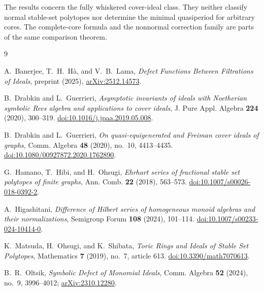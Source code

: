 \documentclass[11pt]{article}
\theoremstyle{remark}
\begin{document}
The results concern the fully whiskered cover-ideal class. They neither
classify normal stable-set polytopes nor determine the minimal
quasiperiod for arbitrary cores. The complete-core formula and the
nonnormal correction family are parts of the same comparison theorem.

\begin{thebibliography}{9}

A.~Banerjee, T.~H.~H\`a, and V.~B.~Lama,
\emph{Defect Functions Between Filtrations of Ideals},
preprint (2025),
\href{https://arxiv.org/abs/2512.14573}{arXiv:2512.14573}.

B.~Drabkin and L.~Guerrieri,
\emph{Asymptotic invariants of ideals with Noetherian symbolic Rees
algebra and applications to cover ideals},
J. Pure Appl. Algebra \textbf{224} (2020), 300--319.
\href{https://doi.org/10.1016/j.jpaa.2019.05.008}{doi:10.1016/j.jpaa.2019.05.008}.

B.~Drabkin and L.~Guerrieri,
\emph{On quasi-equigenerated and Freiman cover ideals of graphs},
Comm. Algebra \textbf{48} (2020), no.~10, 4413--4435.
\href{https://doi.org/10.1080/00927872.2020.1762890}{doi:10.1080/00927872.2020.1762890}.

G.~Hamano, T.~Hibi, and H.~Ohsugi,
\emph{Ehrhart series of fractional stable set polytopes of finite graphs},
Ann. Comb. \textbf{22} (2018), 563--573.
\href{https://doi.org/10.1007/s00026-018-0392-2}{doi:10.1007/s00026-018-0392-2}.

A.~Higashitani,
\emph{Difference of Hilbert series of homogeneous monoid algebras and
their normalizations},
Semigroup Forum \textbf{108} (2024), 101--114.
\href{https://doi.org/10.1007/s00233-024-10414-0}{doi:10.1007/s00233-024-10414-0}.

K.~Matsuda, H.~Ohsugi, and K.~Shibata,
\emph{Toric Rings and Ideals of Stable Set Polytopes},
Mathematics \textbf{7} (2019), no.~7, article 613.
\href{https://doi.org/10.3390/math7070613}{doi:10.3390/math7070613}.

B.~R.~Oltsik,
\emph{Symbolic Defect of Monomial Ideals},
Comm. Algebra \textbf{52} (2024), no.~9, 3996--4012;
\href{https://arxiv.org/abs/2310.12280}{arXiv:2310.12280}.

\end{thebibliography}
\end{document}
